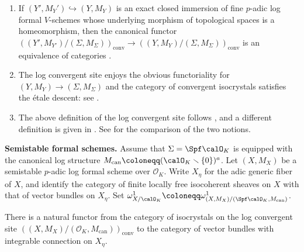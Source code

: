 \begin{rem}\label{rem:first remarks on convergent site}
\hfill
\begin{enumerate}
    \item If $(Y',M_Y')\hookrightarrow (Y,M_Y)$ is an exact closed immersion of fine $p$-adic log formal $V$-schemes whose underlying morphism of topological spaces is a homeomorphism, then the canonical functor $((Y', M_{Y'})/(\Sigma,M_\Sigma))_{\mathrm{conv}}\rightarrow((Y, M_Y)/(\Sigma,M_\Sigma))_{\mathrm{conv}}$
    is an equivalence of categories \cite[Rem.~5.1.3]{Shiho-I}.
    \item The log convergent site enjoys the obvious functoriality for $(Y,M_Y)\rightarrow (\Sigma,M_\Sigma)$ and the category of convergent isocrystals satisfies the \'etale descent: see \cite[Rem.~5.1.5, 5,1,7]{Shiho-I}.
    \item The above definition of the log convergent site follows \cite[Def.~5.1.1]{Shiho-I}, and a different definition is given in \cite[Def.~2.1.1]{Shiho-II}. See \cite[Rem.~2.1.2, Prop.~2.1.7]{Shiho-II} for the comparison of the two notions.
\end{enumerate}
\end{rem}

\noindent
\textbf{Semistable formal schemes.}
Assume that $\Sigma=\Spf \calO_K$ is equipped with the canonical log structure $M_\mathrm{can}\coloneqq (\calO_K\smallsetminus\{0\})^a$. Let $(X, M_X)$ be a semistable $p$-adic log formal scheme over $\mathcal{O}_K$.
Write $X_\eta$ for the adic generic fiber of $X$, and identify the category of finite locally free isocoherent sheaves on $X$ with that of vector bundles on $X_\eta$.
Set $\omega^1_{X/\calO_K}\coloneqq\omega^1_{(X,M_X)/(\Spf\calO_K,M_\mathrm{can})}$.


\begin{prop} \label{prop:functor-converg-isocrys-to-vector-bundle}
There is a natural functor from the category of isocrystals on the log convergent site $((X, M_X) / (\mathcal{O}_K, M_\mathrm{can}))_{\mathrm{conv}}$ to the category of vector bundles with integrable connection on $X_{\eta}$.    
\end{prop}

